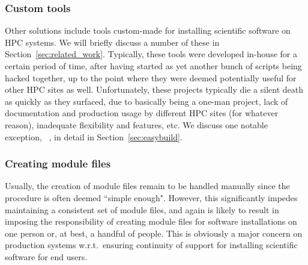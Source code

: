 \subsubsection{Custom tools}

Other solutions include tools custom-made for installing scientific software
on HPC systems. We will briefly discuss a number of these in
Section~\ref{sec:related_work}. Typically, these tools were developed in-house for
a certain period of time, after having started as yet another bunch of
scripts being hacked together, up to the point where they were deemed potentially
useful for other HPC sites as well. Unfortunately, these projects typically die a
silent death as quickly as they surfaced, due to basically being a one-man project,
lack of documentation and production usage by different HPC sites (for whatever
reason), inadequate flexibility and features, etc. We discuss one notable 
exception, \emph{\easybuild{}}~\cite{EasyBuildSC12}, in detail in
Section~\ref{sec:easybuild}.

\subsubsection{Creating module files}

Usually, the creation of module files remain to be handled manually since the
procedure is often deemed ``simple enough". However, this significantly impedes
maintaining a consistent set of module files, and again is likely to result in
imposing the responsibility of creating module files for software installations
on one person or, at best, a handful of people. This is obviously a major concern
on production systems w.r.t.~ensuring continuity of support for installing
scientific software for end users.



